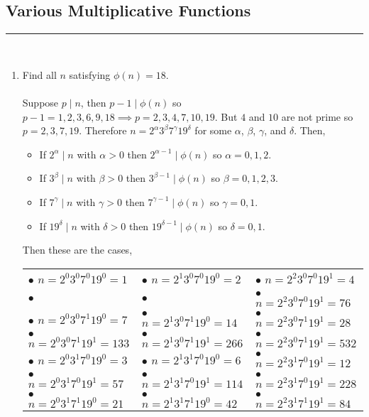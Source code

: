 \documentclass[class=article, crop=false]{standalone}
\begin{document}
\subsection{Various Multiplicative Functions}
\hfill {}
\rule{\textwidth}{1pt}\\
\begin{enumerate}
\item
  Find all $n$ satisfying $\phi(n)=18$. \\\\
  Suppose $p\mid n$, then $p-1\mid \phi(n)$ so $p-1 = 1,2,3,6,9,18 \implies p = 2,3,4,7,10, 19$.
  But $4$ and $10$ are not prime so $p = 2,3,7,19$. Therefore $n = 2^{\alpha} 3^{\beta} 7^{\gamma} 19^{\delta}$
  for some $\alpha$, $\beta$, $\gamma$, and $\delta$. Then, 
  \begin{itemize}
	\item If $2^{\alpha}\mid n$ with $\alpha >0$ then $2^{\alpha -1}\mid\phi(n)$ so $\alpha = 0, 1, 2$.
	\item If $3^{\beta}\mid n$ with $\beta >0$ then $3^{\beta -1}\mid\phi(n)$ so $\beta = 0, 1, 2, 3$.
	\item If $7^{\gamma}\mid n$ with $\gamma >0$ then $7^{\gamma -1}\mid\phi(n)$ so $\gamma = 0, 1$.
	\item If $19^{\delta}\mid n$ with $\delta >0$ then $19^{\delta -1}\mid\phi(n)$ so $\delta = 0, 1$.
  \end{itemize}
  Then these are the cases,
  \begin{center}
	\begin{tabular}{ l l l }
	  $\bullet$ $n=2^0 3^0 7^0 19^0 = 1$ &    $\bullet$ $n=2^1 3^0 7^0 19^0 = 2$ & $\bullet$ $n=2^2 3^0 7^0 19^1 = 4$\\
	  $\bullet$\fbox{$n=2^0 3^0 7^0 19^1 = 19$} &   $\bullet$\fbox{$n=2^1 3^0 7^0 19^1 = 38$} & $\bullet$ $n=2^2 3^0 7^0 19^1 = 76$\\
	  $\bullet$ $n=2^0 3^0 7^1 19^0 = 7$ &    $\bullet$ $n=2^1 3^0 7^1 19^0 = 14$ & $\bullet$ $n=2^2 3^0 7^1 19^1 = 28$\\
	  $\bullet$ $n=2^0 3^0 7^1 19^1 = 133$ &   $\bullet$ $n=2^1 3^0 7^1 19^1 = 266$ & $\bullet$ $n=2^2 3^0 7^1 19^1 = 532$\\
	  $\bullet$ $n=2^0 3^1 7^0 19^0 = 3$ &    $\bullet$ $n=2^1 3^1 7^0 19^0 = 6$ & $\bullet$ $n=2^2 3^1 7^0 19^1 = 12$\\
	  $\bullet$ $n=2^0 3^1 7^0 19^1 = 57$ &   $\bullet$ $n=2^1 3^1 7^0 19^1 = 114$ & $\bullet$ $n=2^2 3^1 7^0 19^1 = 228$\\
	  $\bullet$ $n=2^0 3^1 7^1 19^0 = 21$ &    $\bullet$ $n=2^1 3^1 7^1 19^0 = 42$ & $\bullet$ $n=2^2 3^1 7^1 19^1 = 84$\\

\end{tabular}
\end{center}
\end{enumerate}
\end{document}
